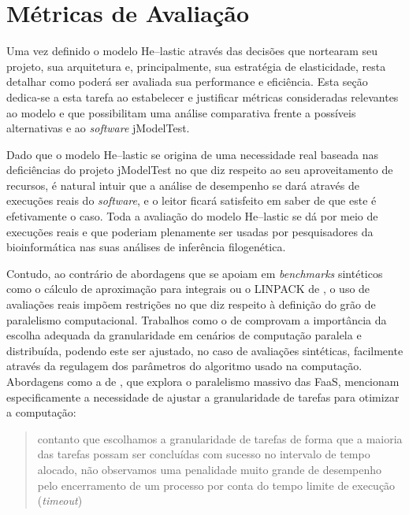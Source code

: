 \documentclass[english,brazilian]{UNISINOSmonografia} %
\begin{document}
\section{Métricas de Avaliação}
\label{sec:modelo-metricas}



Uma vez definido o modelo \textsf{He}--lastic através das decisões que nortearam seu projeto, sua arquitetura e, principalmente, sua estratégia de elasticidade, resta detalhar como poderá ser avaliada sua performance e eficiência.
Esta seção dedica-se a esta tarefa ao estabelecer e justificar métricas consideradas relevantes ao modelo e que possibilitam uma análise comparativa frente a possíveis alternativas e ao \textit{software} jModelTest.


Dado que o modelo \textsf{He}--lastic se origina de uma necessidade real baseada nas deficiências do projeto jModelTest no que diz respeito ao seu aproveitamento de recursos, é natural intuir que a análise de desempenho se dará através de execuções reais do \textit{software}, e o leitor ficará satisfeito em saber de que este é efetivamente o caso.
Toda a avaliação do modelo \textsf{He}--lastic se dá por meio de execuções reais e que poderiam plenamente ser usadas por pesquisadores da bioinformática nas suas análises de inferência filogenética.


Contudo, ao contrário de abordagens que se apoiam em \textit{benchmarks} sintéticos como o cálculo de aproximação para integrais ou o LINPACK de , o uso de avaliações reais impõem restrições no que diz respeito à definição do grão de paralelismo computacional.
Trabalhos como o de  comprovam a importância da escolha adequada da granularidade em cenários de computação paralela e distribuída, podendo este ser ajustado, no caso de avaliações sintéticas, facilmente através da regulagem dos parâmetros do algoritmo usado na computação.
Abordagens como a de , que explora o paralelismo massivo das FaaS, mencionam especificamente a necessidade de ajustar a granularidade de tarefas para otimizar a computação:
\begin{quote}
	contanto que escolhamos a granularidade de tarefas de forma que a maioria das tarefas possam ser concluídas com sucesso no intervalo de tempo alocado, não observamos uma penalidade muito grande de desempenho pelo encerramento de um processo por conta do tempo limite de execução (\textit{timeout})
\end{quote}
\end{document}
